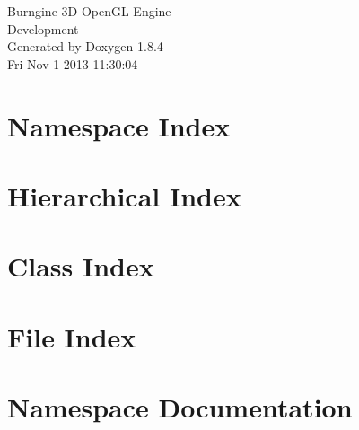 \documentclass[twoside]{book}
\newcommand{\clearemptydoublepage}{%
  \newpage{\pagestyle{empty}\cleardoublepage}%
}
\begin{document}
\hypersetup{pageanchor=false}
\begin{titlepage}
\vspace*{7cm}
\begin{center}%
{\Large Burngine 3\-D Open\-G\-L-\/\-Engine \\[1ex]\large Development }\\
\vspace*{1cm}
{\large Generated by Doxygen 1.8.4}\\
\vspace*{0.5cm}
{\small Fri Nov 1 2013 11:30:04}\\
\end{center}
\end{titlepage}
\clearemptydoublepage
\tableofcontents
\clearemptydoublepage
{}
\hypersetup{pageanchor=true}

\chapter{Namespace Index}

\chapter{Hierarchical Index}

\chapter{Class Index}

\chapter{File Index}

\chapter{Namespace Documentation}

\end{document}
